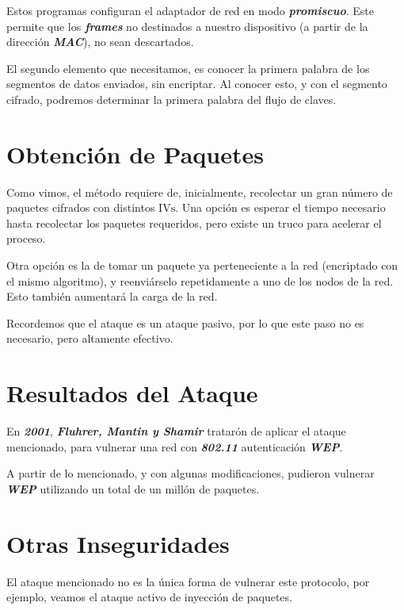 \documentclass[
]{article}
\begin{document}
Estos programas configuran el adaptador de red en modo
\textbf{\emph{promiscuo}}. Este permite que los \textbf{\emph{frames}}
no destinados a nuestro dispositivo (a partir de la dirección
\textbf{\emph{MAC}}), no sean descartados.

El segundo elemento que necesitamos, es conocer la primera palabra de
los segmentos de datos enviados, sin encriptar. Al conocer esto, y con
el segmento cifrado, podremos determinar la primera palabra del flujo de
claves.

\hypertarget{obtenciuxf3n-de-paquetes}{%
\section{Obtención de Paquetes}\label{obtenciuxf3n-de-paquetes}}

Como vimos, el método requiere de, inicialmente, recolectar un gran
número de paquetes cifrados con distintos \(\text{IVs}\). Una opción es
esperar el tiempo necesario hasta recolectar los paquetes requeridos,
pero existe un truco para acelerar el proceso.

Otra opción es la de tomar un paquete ya perteneciente a la red
(encriptado con el mismo algoritmo), y reenviárselo repetidamente a uno
de los nodos de la red. Esto también aumentará la carga de la red.

Recordemos que el ataque es un ataque pasivo, por lo que este paso no es
necesario, pero altamente efectivo.

\hypertarget{resultados-del-ataque}{%
\section{Resultados del Ataque}\label{resultados-del-ataque}}

En \textbf{\emph{2001}}, \textbf{\emph{Fluhrer, Mantin y Shamir}}
tratarón de aplicar el ataque mencionado, para vulnerar una red con
\textbf{\emph{802.11}} autenticación \textbf{\emph{WEP}}.

A partir de lo mencionado, y con algunas modificaciones, pudieron
vulnerar \textbf{\emph{WEP}} utilizando un total de un millón de
paquetes.

\hypertarget{otras-inseguridades}{%
\section{Otras Inseguridades}\label{otras-inseguridades}}

El ataque mencionado no es la única forma de vulnerar este protocolo,
por ejemplo, veamos el ataque activo de inyección de paquetes.
\end{document}
